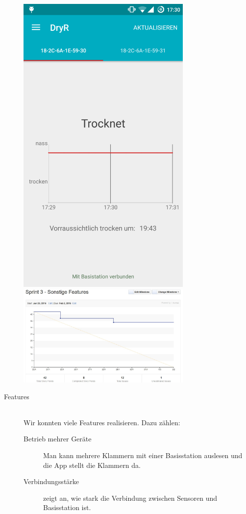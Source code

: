 \begin{description}
		\includegraphics[width=0.7\textwidth]{laundry_status_diagram_forecast.png}
		\includegraphics[width=0.7\textwidth]{burndown_sprint3.jpg}
	\item [Features] \hfill \\
		Wir konnten viele Features realisieren. Dazu zählen:
		\begin{description}
			\item [Betrieb mehrer Geräte] Man kann mehrere Klammern mit einer Basisstation auslesen und die App stellt die Klammern da.
			\item [Verbindungsstärke] zeigt an, wie stark die Verbindung zwischen Sensoren und Basisstation ist.

\end{description}
\end{description}
